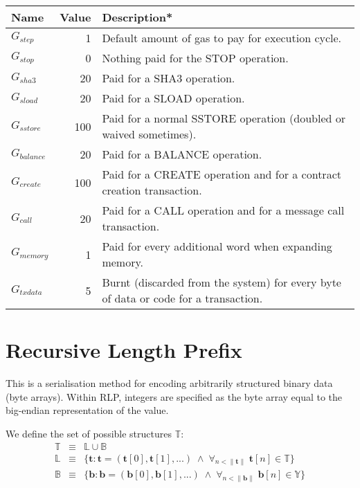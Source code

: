 \documentclass[9pt,oneside]{amsart}
\begin{document}
\begin{tabular*}{\columnwidth}[h]{lrl}
\toprule
Name & Value & Description* \\
\midrule
$G_{step}$ & 1 & Default amount of gas to pay for execution cycle. \\
$G_{stop}$ & 0 & Nothing paid for the {\small STOP} operation. \\
$G_{sha3}$ & 20 & Paid for a {\small SHA3} operation. \\
$G_{sload}$ & 20 & Paid for a {\small SLOAD} operation. \\
$G_{sstore}$ & 100 & Paid for a normal {\small SSTORE} operation (doubled or waived sometimes). \\
$G_{balance}$ & 20 & Paid for a {\small BALANCE} operation. \\
$G_{create}$ & 100 & Paid for a {\small CREATE} operation and for a contract creation transaction. \\
$G_{call}$ & 20 & Paid for a {\small CALL} operation and for a message call transaction. \\
$G_{memory}$ & 1 & Paid for every additional word when expanding memory. \\
$G_{txdata}$ & 5 & Burnt (discarded from the system) for every byte of data or code for a transaction. \\
\bottomrule
\end{tabular*}

\section{Recursive Length Prefix}\label{app:rlp}
This is a serialisation method for encoding arbitrarily structured binary data (byte arrays). Within RLP, integers are specified as the byte array equal to the big-endian representation of the value.

We define the set of possible structures $\mathbb{T}$:
\begin{eqnarray}
\mathbb{T} & \equiv & \mathbb{L} \cup \mathbb{B} \\
\mathbb{L} & \equiv & \{ \mathbf{t}: \mathbf{t} = ( \mathbf{t}[0], \mathbf{t}[1], ... ) \; \wedge \; \forall_{n < \lVert \mathbf{t} \rVert} \; \mathbf{t}[n] \in \mathbb{T} \} \\
\mathbb{B} & \equiv & \{ \mathbf{b}: \mathbf{b} = ( \mathbf{b}[0], \mathbf{b}[1], ... ) \; \wedge \; \forall_{n < \lVert \mathbf{b} \rVert} \; \mathbf{b}[n] \in \mathbb{Y} \}
\end{eqnarray}
\end{document}
